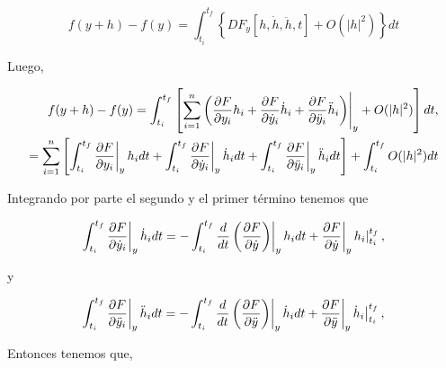 \documentclass[a4paper,10pt]{article}
\numberwithin{equation}{section}
\newcommand{\zerodel}{.\kern-\nulldelimiterspace}
\begin{document}
\begin{equation}
 f(y+h) - f(y) =  \int_{t_{i}}^{t_{f}} \left\{DF_y[h,\dot{h},\ddot{h},t] + O(|h|^2) \right\}dt
\end{equation}

Luego,

\begin{align*}
 f(y+h) - f(y) = \int_{t_{i}}^{t_{f}} \left[ \left\zerodel \sum_{i=1}^n  \left( \frac{\partial F}{\partial y_i}h_i + 
 \frac{\partial F}{\partial \dot{y}_i}\dot{h}_i + \frac{\partial F}{\partial \ddot{y}_i}\ddot{h}_i\right)\right|_{y} 
 + O(|h|^2) \right]dt, \\
%  
	      = \sum_{i=1}^n \left[\int_{t_{i}}^{t_{f}}\left\zerodel\frac{\partial F}{\partial y_i}\right|_y h_i dt  
	      + \int_{t_{i}}^{t_{f}} \left\zerodel\frac{\partial F}{\partial \dot{y}_i}\right|_y \dot{h}_i dt
	       + \int_{t_{i}}^{t_{f}} \left\zerodel\frac{\partial F}{\partial \ddot{y}_i}\right|_y \ddot{h}_i dt\right] 
	       +  \int_{t_{i}}^{t_{f}} O(|h|^2)dt
\end{align*}

Integrando por parte el segundo y el primer término tenemos que

\begin{equation}
  \int_{t_{i}}^{t_{f}} \left\zerodel\frac{\partial F}{\partial \dot{y}_i}\right|_y \dot{h}_i dt = 
  - \int_{t_{i}}^{t_{f}} \frac{d}{dt}\left(\left\zerodel\frac{\partial F}{\partial \dot{y}}\right)\right|_y h_i dt + 
  \left\zerodel\frac{\partial F}{\partial \dot{y}}\right|_y \left\zerodel h_i\right|_{t_{i}}^{t_{f}},
\end{equation}

y

\begin{equation}
  \int_{t_{i}}^{t_{f}} \left\zerodel\frac{\partial F}{\partial \ddot{y}_i}\right|_y \ddot{h}_i dt = 
  - \int_{t_{i}}^{t_{f}} \frac{d}{dt}\left(\left\zerodel\frac{\partial F}{\partial \ddot{y}}\right)\right|_y \dot{h}_i dt + 
  \left\zerodel\frac{\partial F}{\partial \ddot{y}}\right|_y \left\zerodel \dot{h}_i\right|_{t_{i}}^{t_{f}},
\end{equation}

Entonces tenemos que,
\end{document}
